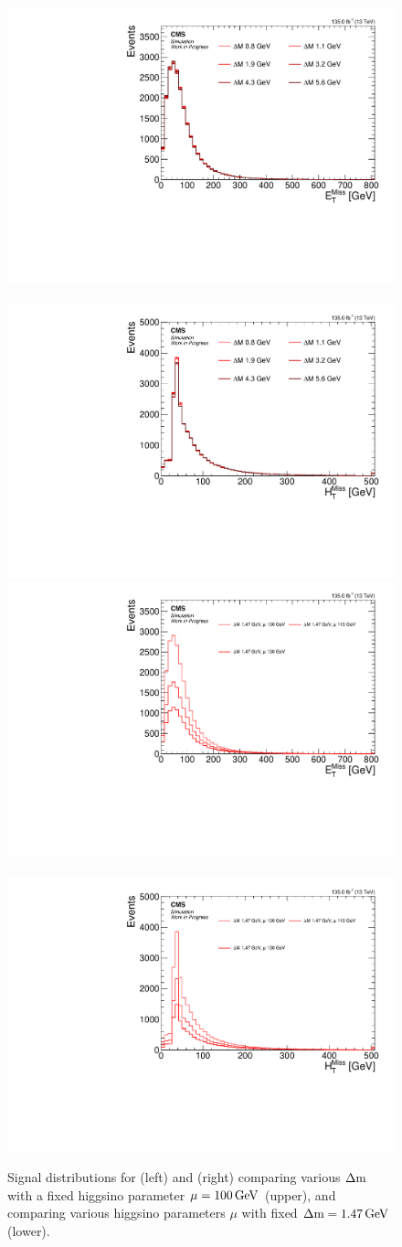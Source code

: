 \begin{figure}[!htb]
\centering
\includegraphics[width=0.48\linewidth]{plots/signal_common_distributions_fixed_mu/none_MET.pdf} \,
\includegraphics[width=0.48\linewidth]{plots/signal_common_distributions_fixed_mu/none_MHT.pdf}  \\
\includegraphics[width=0.48\linewidth]{plots/signal_common_distributions_fixed_dm/none_MET.pdf} \,
\includegraphics[width=0.48\linewidth]{plots/signal_common_distributions_fixed_dm/none_MHT.pdf}  \\
\caption[Signal $\MET$ and $\mht$ distributions]{ Signal distributions for \MET (left) and \mht (right) comparing various $\Delta\mathrm{m}$ with a fixed higgsino parameter $\mu=100\,\text{Ge\hspace{-.08em}V}$ (upper), and comparing various higgsino parameters $\mu$ with fixed $\Delta\mathrm{m}=1.47\,\text{Ge\hspace{-.08em}V}$ (lower).}
\label{fig:signal-met-mht}
\end{figure}

